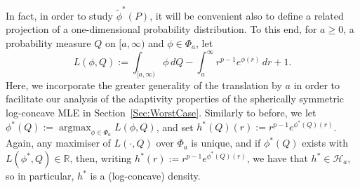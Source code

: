 \documentclass[a4paper,12pt]{article}
\DeclareMathOperator*{\argmax}{argmax}
\begin{document}
In fact, in order to study $\tilde{\phi}^*(P)$, it will be convenient also to define a related projection of a one-dimensional probability distribution.  To this end, for $a \geq 0$, a probability measure $Q$ on $[a, \infty)$ and $\phi \in \Phi_{a}$, let
\begin{equation}
  \label{Eq:QProjection}
  L(\phi, Q) := \int_{[a,\infty)} \phi \, dQ - \int_{a}^\infty r^{p-1} e^{\phi(r)} \, dr + 1.
\end{equation}
Here, we incorporate the greater generality of the translation by $a$ in order to facilitate our analysis of the adaptivity properties of the spherically symmetric log-concave MLE in Section~\ref{Sec:WorstCase}.  Similarly to before, we let $\phi^*(Q) := \argmax_{\phi \in \Phi_{a}} L(\phi,Q)$, and set $h^*(Q)(r) := r^{p-1}e^{\phi^*(Q)(r)}$.  Again, any maximiser of $L(\cdot,Q)$ over $\Phi_{a}$ is unique, and if $\phi^*(Q)$ exists with $L(\phi^*, Q) \in \mathbb{R}$, then, writing $h^*(r) := r^{p-1}e^{\phi^*(Q)(r)}$, we have that $h^* \in \mathcal{H}_{a}$, so in particular, $h^*$ is a (log-concave) density.  
\end{document}
